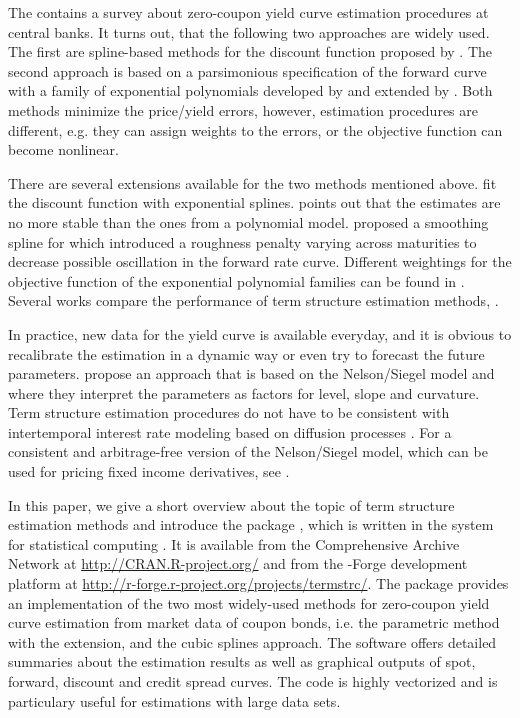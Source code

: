 The \cite{BIS2005} contains a survey about zero-coupon yield curve estimation procedures at central banks. It turns out, that the following two approaches are widely used. The first are spline-based methods for the discount function proposed by \cite{McCulloch1971, McCulloch1975}. The second approach is based on a parsimonious specification of the forward curve with a family of exponential polynomials developed by \cite{Nelson1987} and extended by \cite{Svensson1994}. Both methods minimize the price/yield errors, however, estimation procedures are different, e.g. they can assign weights to the errors, or the objective function can become nonlinear.

There are several extensions available for the two methods mentioned above. \cite{Vasicek1982} fit the discount function with exponential splines. \cite{Shea1985} points out that the estimates are no more stable than the ones from a polynomial model. \cite{Fisher1995} proposed a smoothing spline for which \cite{Waggoner1997} introduced a roughness penalty varying across maturities to decrease possible oscillation in the forward rate curve. Different weightings for the objective function of the exponential polynomial families can be found in \cite{Soederlind1997}. Several works compare the performance of term structure estimation methods, \citep[see, e.g.][]{Bliss1997, Bolder1999, Ioannides2003}.

In practice, new data for the yield curve is available everyday, and it is obvious to recalibrate the estimation in a dynamic way or even try to forecast the future parameters. \cite{Diebold2006} propose an approach that is based on the Nelson/Siegel model and where they interpret the parameters as factors for level, slope and curvature. Term structure estimation procedures do not have to be consistent with intertemporal interest rate modeling based on diffusion processes \citep[see, e.g.][]{Bjoerk1999, Filipovic1999}. For a consistent and arbitrage-free version of the Nelson/Siegel model, which can be used for pricing fixed income derivatives, see \cite{Christensen2007}.   

In this paper, we give a short overview about the topic of term structure estimation methods and introduce the package , which is written in the  system for statistical computing \citep{R2008}. It is available from the Comprehensive  Archive Network at \url{http://CRAN.R-project.org/} and from the -Forge development platform at \url{http://r-forge.r-project.org/projects/termstrc/}. The package provides an implementation of the two most widely-used methods for zero-coupon yield curve estimation from market data of coupon bonds, i.e. the parametric \cite{Nelson1987} method with the \cite{Svensson1994} extension, and the \cite{McCulloch1975} cubic splines approach. The software offers detailed summaries about the estimation results as well as graphical outputs of spot, forward, discount and credit spread curves. The code is highly vectorized and is particulary useful for estimations with large data sets.


